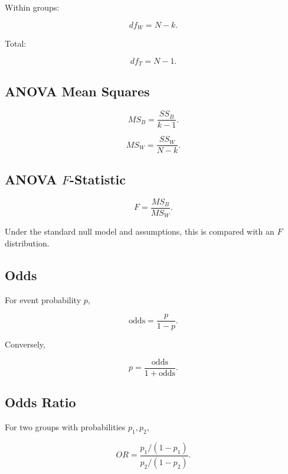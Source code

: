 Within groups:

\[
\boxed{
df_W
=
N-k.
}
\]

Total:

\[
\boxed{
df_T
=
N-1.
}
\]

\subsection{ANOVA Mean Squares}
\label{subsec:anova-mean-squares}

\[
\boxed{
MS_B
=
\frac{
SS_B
}{
k-1
}.
}
\]

\[
\boxed{
MS_W
=
\frac{
SS_W
}{
N-k
}.
}
\]

\subsection{ANOVA \(F\)-Statistic}
\label{subsec:anova-f-statistic}

\[
\boxed{
F
=
\frac{
MS_B
}{
MS_W
}.
}
\]

Under the standard null model and assumptions, this is compared with an
\(F\) distribution.

\subsection{Odds}
\label{subsec:odds-reference}

For event probability \(p\),

\[
\boxed{
\text{odds}
=
\frac{
p
}{
1-p
}.
}
\]

Conversely,

\[
\boxed{
p
=
\frac{
\text{odds}
}{
1+\text{odds}
}.
}
\]

\subsection{Odds Ratio}
\label{subsec:odds-ratio-reference}

For two groups with probabilities \(p_1,p_2\),

\[
\boxed{
OR
=
\frac{
p_1/(1-p_1)
}{
p_2/(1-p_2)
}.
}
\]

